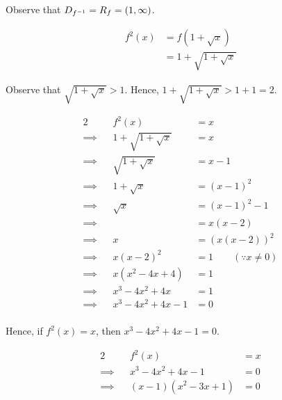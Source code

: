 \documentclass{echw}
\begin{document}

                Observe that $D_{f^{-1}} = R_{f} = (1, \infty)$.


            \subpart
                \begin{align*}
                    f^2(x) &= f(1+\sqrt{x})\\
                    &= 1 + \sqrt{1 + \sqrt{x}}
                \end{align*}


                Observe that $\sqrt{1 + \sqrt{x}} > 1$. Hence, $1 + \sqrt{1 + \sqrt{x}} > 1 + 1 = 2$.


            \subpart
                \begin{alignat*}{2}
                    &&f^2(x) &= x\\
                    \implies&& 1 + \sqrt{1 + \sqrt{x}} &= x\\
                    \implies&& \sqrt{1 + \sqrt{x}} &= x - 1\\
                    \implies&& 1 + \sqrt{x} &= (x - 1)^2\\
                    \implies&& \sqrt{x} &= (x - 1)^2 - 1\\
                    \implies&& &= x(x-2)\\
                    \implies&& x &= (x(x-2))^2\\
                    \implies&& x(x-2)^2 &= 1 \qquad (\because x \neq 0)\\
                    \implies&& x\left(x^2 -4x + 4 \right) &= 1 \\
                    \implies&& x^3 -4x^2 + 4x  &= 1 \\
                    \implies&& x^3 -4x^2 + 4x -1 &= 0 \\
                \end{alignat*}

                Hence, if $f^2(x) = x$, then $x^3 -4x^2 + 4x -1 = 0$.

                \begin{alignat*}{2}
                    &&f^2(x) &= x\\
                    \implies&&x^3 -4x^2 + 4x -1 &= 0 \\
                    \implies&&(x-1)\left(x^2-3x+1\right) &= 0
                \end{alignat*}
\end{document}
